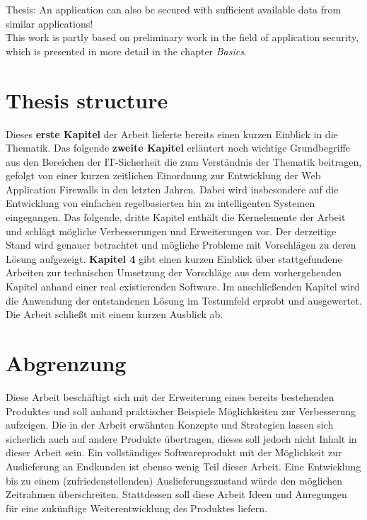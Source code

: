 \textcolor{bhtGray}{ Thesis:} An application can also be secured with sufficient available data from similar applications!\\

This work is partly based on preliminary work in the field of application security, which is presented in more detail in the chapter \glqq\emph{Basics}\grqq{}.


\section{Thesis structure}


Dieses \textbf{erste Kapitel} der Arbeit lieferte bereits einen kurzen Einblick in die Thematik. Das folgende \textbf{zweite Kapitel} erläutert noch wichtige Grundbegriffe aus den Bereichen der IT-Sicherheit die zum Verständnis der Thematik beitragen, gefolgt von einer kurzen zeitlichen Einordnung zur Entwicklung der Web Application Firewalls in den letzten Jahren. Dabei wird insbesondere auf die Entwicklung von einfachen regelbasierten hin zu intelligenten Systemen eingegangen. Das folgende, dritte Kapitel enthält die Kernelemente der Arbeit und schlägt mögliche Verbesserungen und Erweiterungen vor. Der derzeitige Stand wird genauer betrachtet und mögliche Probleme mit Vorschlägen zu deren Lösung aufgezeigt. \textbf{Kapitel 4} gibt einen kurzen Einblick über stattgefundene Arbeiten zur technischen Umsetzung der Vorschläge aus dem vorhergehenden Kapitel anhand einer real existierenden Software. Im anschließenden Kapitel wird die Anwendung der entstandenen Lösung im Testumfeld erprobt und ausgewertet. Die Arbeit schließt mit einem kurzen Ausblick ab.

\section{Abgrenzung}

Diese Arbeit beschäftigt sich mit der Erweiterung eines bereits bestehenden Produktes und soll anhand praktischer Beispiele Möglichkeiten zur Verbesserung aufzeigen. Die in der Arbeit erwähnten Konzepte und Strategien lassen sich sicherlich auch auf andere Produkte übertragen, dieses soll jedoch nicht Inhalt in dieser Arbeit sein. Ein vollständiges Softwareprodukt mit der Möglichkeit zur Auslieferung an Endkunden ist ebenso wenig Teil dieser Arbeit. Eine Entwicklung bis zu einem (zufriedenstellenden) Auslieferungszustand würde den möglichen Zeitrahmen überschreiten. Stattdessen soll diese Arbeit Ideen und Anregungen für eine zukünftige Weiterentwicklung des Produktes liefern.
